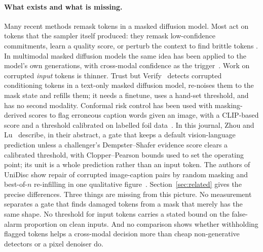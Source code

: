 \paragraph{What exists and what is missing.}
Many recent methods remask tokens in a masked diffusion model.
Most act on tokens that the sampler itself produced: they remask low-confidence commitments, learn a quality score, or
perturb the context to find brittle tokens
\cite{wang2025remdm,kim2025prism,schiff2026proseco,huang2025remedi,zhai2026core,yao2026remask,lezama2022tokencritic}.
In multimodal masked diffusion models the same idea has been applied to the model's own generations, with cross-modal
confidence as the trigger~\cite{ouyang2026freecorrection,le2026co2jump}.
Work on corrupted \emph{input} tokens is thinner.
Trust but Verify~\cite{jhingran2026trustverify} detects corrupted conditioning tokens in a text-only masked diffusion model,
re-noises them to the mask state and refills them; it needs a finetune, uses a hand-set threshold, and has no second modality.
Conformal risk control has been used with masking-derived scores to flag erroneous caption words given an image, with a
CLIP-based score and a threshold calibrated on labelled foil data~\cite{gomes2025crc}.
In this journal, Zhou and Lu~\cite{zhou2027burden} describe, in their abstract, a gate that keeps a default
vision-language prediction unless a challenger's Dempster--Shafer evidence score clears a calibrated threshold, with Clopper--Pearson
bounds used to set the operating point; its unit is a whole prediction rather than an input token. 
The authors of UniDisc show repair of corrupted image-caption pairs by random masking and best-of-$n$ re-infilling in one
qualitative figure~\cite{swerdlow2025unidisc}.
Section~\ref{sec:related} gives the precise differences.
Three things are missing from this picture.
No measurement separates a gate that finds damaged tokens from a mask that merely has the same shape.
No threshold for input tokens carries a stated bound on the false-alarm proportion on clean inputs.
And no comparison shows whether withholding flagged tokens helps a cross-modal decision more than cheap non-generative
detectors or a pixel denoiser do.

